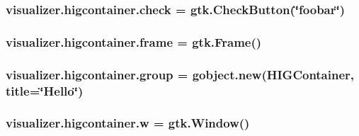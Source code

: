 \subsubsection[{\texorpdfstring{check}{check}}]{\setlength{\rightskip}{0pt plus 5cm}visualizer.\+higcontainer.\+check = gtk.\+Check\+Button(\char`\"{}foobar\char`\"{})}\hypertarget{namespacevisualizer_1_1higcontainer_ac48d36b2f857bd4ef93244235f447292}{}\label{namespacevisualizer_1_1higcontainer_ac48d36b2f857bd4ef93244235f447292}
\subsubsection[{\texorpdfstring{frame}{frame}}]{\setlength{\rightskip}{0pt plus 5cm}visualizer.\+higcontainer.\+frame = gtk.\+Frame()}\hypertarget{namespacevisualizer_1_1higcontainer_a3a06b62552347e51aaf4765391802719}{}\label{namespacevisualizer_1_1higcontainer_a3a06b62552347e51aaf4765391802719}
\subsubsection[{\texorpdfstring{group}{group}}]{\setlength{\rightskip}{0pt plus 5cm}visualizer.\+higcontainer.\+group = gobject.\+new({\bf H\+I\+G\+Container}, {\bf title}=\char`\"{}Hello\char`\"{})}\hypertarget{namespacevisualizer_1_1higcontainer_aa6ad2b76790275bfce7783429beaa23f}{}\label{namespacevisualizer_1_1higcontainer_aa6ad2b76790275bfce7783429beaa23f}
\subsubsection[{\texorpdfstring{w}{w}}]{\setlength{\rightskip}{0pt plus 5cm}visualizer.\+higcontainer.\+w = gtk.\+Window()}\hypertarget{namespacevisualizer_1_1higcontainer_a10ef12e30d471bb1281c3444b2aba394}{}\label{namespacevisualizer_1_1higcontainer_a10ef12e30d471bb1281c3444b2aba394}
